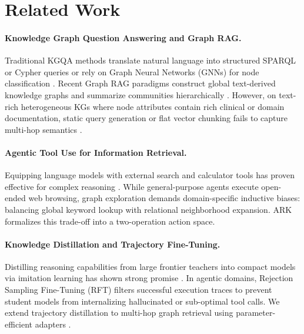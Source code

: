 \documentclass[11pt]{article}
\begin{document}
\section{Related Work}
\label{sec:related}

\paragraph{Knowledge Graph Question Answering and Graph RAG.}
Traditional KGQA methods translate natural language into structured SPARQL or Cypher queries \citep{sun2023thinkongraph} or rely on Graph Neural Networks (GNNs) for node classification \citep{yasunaga2021qa}. Recent Graph RAG paradigms construct global text-derived knowledge graphs and summarize communities hierarchically \citep{edge2024graphrag}. However, on text-rich heterogeneous KGs where node attributes contain rich clinical or domain documentation, static query generation or flat vector chunking fails to capture multi-hop semantics \citep{wu2024stark}.

\paragraph{Agentic Tool Use for Information Retrieval.}
Equipping language models with external search and calculator tools has proven effective for complex reasoning \citep{yao2022react,chen2023teaching}. While general-purpose agents execute open-ended web browsing, graph exploration demands domain-specific inductive biases: balancing global keyword lookup with relational neighborhood expansion. ARK \citep{polonuer2026ark} formalizes this trade-off into a two-operation action space.

\paragraph{Knowledge Distillation and Trajectory Fine-Tuning.}
Distilling reasoning capabilities from large frontier teachers into compact models via imitation learning has shown strong promise \citep{ouyang2022instructgpt}. In agentic domains, Rejection Sampling Fine-Tuning (RFT) filters successful execution traces to prevent student models from internalizing hallucinated or sub-optimal tool calls. We extend trajectory distillation to multi-hop graph retrieval using parameter-efficient adapters \citep{hu2022lora,dettmers2023qlora}.
\end{document}

